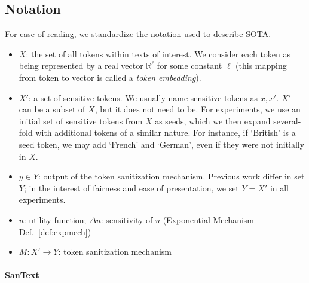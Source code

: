 \documentclass[11pt]{article}
\newcommand{\clusant}{CluSanT\xspace}
\begin{document}
\subsection{Notation}
For ease of reading, we standardize the notation used to describe SOTA. 
\begin{itemize}
\setlength\itemsep{0em}
    \item $X$: the set of all tokens within texts of interest. We consider each token as being represented by a real vector $\mathbb{R}^\ell$ for some constant $\ell$ (this mapping from token to vector is called a {\em token embedding}).
    \item $X'$: a set of sensitive tokens. We usually name sensitive tokens as $x, x'$. $X'$ can be a subset of $X$, but it does not need to be. 
    For experiments, we use an initial set of sensitive tokens from $X$ as seeds, which we then expand several-fold with additional tokens of a similar nature. For instance, if `British' is a seed token, we may add `French' and `German', even if they were not initially in $X$. %
    \item $y\in Y$:  output of the token sanitization mechanism. Previous work differ in set $Y$; in the interest of fairness and ease of presentation, we set $Y = X'$ in all experiments. 
    \item $u$: utility function; $\Delta u$: sensitivity of $u$ 
    (Exponential Mechanism Def.~\ref{def:expmech})
    \item $M:X' \rightarrow Y$: token sanitization mechanism 
\end{itemize}


\paragraph{SanText~\cite{yue2021differential}}
\end{document}
